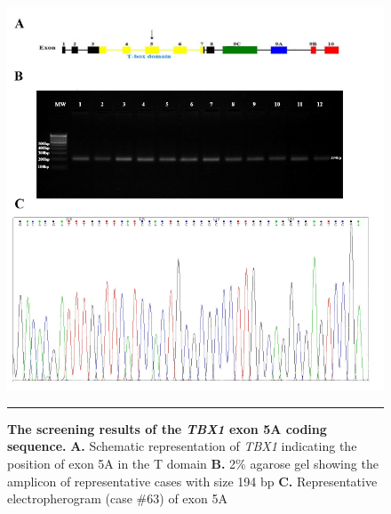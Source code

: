 \begin{refsection}
\begin{figure}[!thbp]
\centering
\includegraphics[width=\linewidth]{Figures/Figure4_5TBX5A.pdf}
\rule{35em}{0.5pt}
\caption{\textbf{The screening results of the \textit{TBX1} exon 5A coding sequence.}
\textbf{A.} Schematic representation of \textit{TBX1} indicating the position of exon 5A in the T domain 
\textbf{B.} 2\% agarose gel showing the amplicon of representative cases with size 194 bp \textbf{C.} Representative electropherogram (case \#63) of exon 5A}
\label{fig:4_5}
\end{figure}


\end{refsection}
